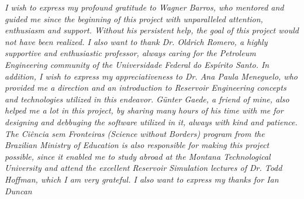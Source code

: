 \newpage \vspace*{4cm}
\thispagestyle{empty}
\begin{center}
	\large \emph{ I wish to express my profound gratitude to Wagner Barros, who mentored and guided me since the beginning of this project with unparalleled attention, enthusiasm and support. Without his persistent help, the goal of this project would not have been realized. I also want to thank Dr. Oldrich Romero, a highly supportive and enthusiastic professor, always caring for the Petroleum Engineering community of the Universidade Federal do Esp\'irito Santo. In addition, I wish to express my appreciativeness to Dr. Ana Paula Meneguelo, who provided me a direction and an introduction to Reservoir Engineering concepts and technologies utilized in this endeavor. G\"unter Gaede, a friend of mine, also helped me a lot in this project, by sharing many hours of his time with me for designing and debbuging the software utilized in it, always with kind and patience.
	The Ci\^encia sem Fronteiras (Science without Borders) program from the Brazilian Ministry of Education is also responsible for making this project possible, since it enabled me to study abroad at the Montana Technological University and attend the excellent Reservoir Simulation lectures of Dr. Todd Hoffman, which I am very grateful. I also want to express my thanks for Ian Duncan}
\end{center}
